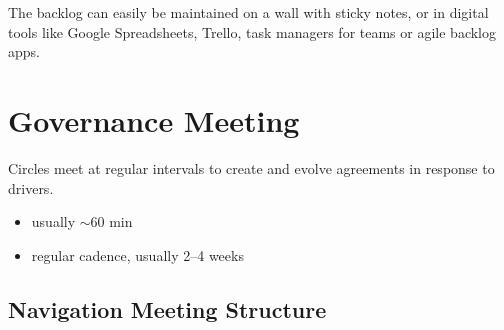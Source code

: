 The backlog can easily be maintained on a wall with sticky notes, or in digital tools like Google Spreadsheets, Trello, task managers for teams or agile backlog apps.

\section{Governance Meeting}
\label{governancemeeting}

Circles meet at regular intervals to create and evolve agreements in response to drivers.

\begin{itemize}
\item usually \ensuremath{\sim}60 min

\item regular cadence, usually 2--4 weeks

\end{itemize}

\subsection{Navigation Meeting Structure}
\label{navigationmeetingstructure}

